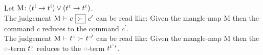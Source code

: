 Let $\text{M} \colon (t^{\polprd} \to t^{\polprd}) \lor (t^{\polcon} \to t^{\polcon})$.
\\
The judgement $\manglecmd{\text{M}}{c}{c^{\prime}}$ can be read like: Given the mangle-map $\text{M}$ then the command $c$ reduces to the command $c^{\prime}$.
\\
The judgement $\mangletm{\text{M}}{t^{\pol}}{t^{\pol\prime}}$ can be read like: Given the mangle-map $\text{M}$ then the $\pol$-term $t^{\pol}$ reduces to the $\pol$-term $t^{t^{\pol}\prime}$.

\begin{prooftree}
\end{prooftree}
\vspace*{0.3cm}

\begin{prooftree}
\end{prooftree}
\vspace*{0.3cm}

\begin{prooftree}
\end{prooftree}
\vspace*{0.3cm}

\begin{prooftree}
\end{prooftree}
\vspace*{0.3cm}

\begin{prooftree}
\end{prooftree}
\vspace*{0.3cm}

